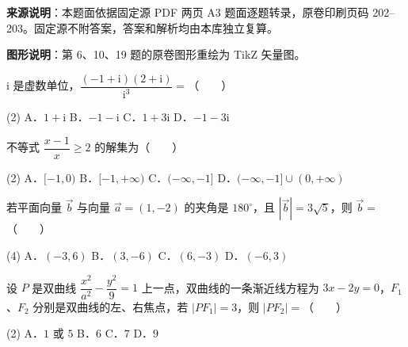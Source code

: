 

\begin{gktip}
\textbf{来源说明}：本题面依据固定源 PDF 两页 A3 题面逐题转录，原卷印刷页码 202–203。固定源不附答案，答案和解析均由本库独立复算。

\textbf{图形说明}：第 6、10、19 题的原卷图形重绘为 TikZ 矢量图。
\end{gktip}


\begin{question}
$\mathrm{i}$ 是虚数单位，$\dfrac{(-1 + \mathrm{i})(2 + \mathrm{i})}{\mathrm{i}^3} =$\mbox{（　　）}

\begin{gkopts}(2)
\task A．$1 + \mathrm{i}$
\task B．$-1 - \mathrm{i}$
\task C．$1 + 3\mathrm{i}$
\task D．$-1 - 3\mathrm{i}$
\end{gkopts}

\end{question}
\begin{question}
不等式 $\dfrac{x-1}{x} \ge 2$ 的解集为\mbox{（　　）}

\begin{gkopts}(2)
\task A．$[-1, 0)$
\task B．$[-1, +\infty)$
\task C．$(-\infty, -1]$
\task D．$(-\infty, -1] \cup (0, +\infty)$
\end{gkopts}

\end{question}
\begin{question}
若平面向量 $\vec{b}$ 与向量 $\vec{a} = (1, -2)$ 的夹角是 $180^\circ$，且 $|\vec{b}| = 3\sqrt{5}$，则 $\vec{b} =$\mbox{（　　）}

\begin{gkopts}(4)
\task A．$(-3, 6)$
\task B．$(3, -6)$
\task C．$(6, -3)$
\task D．$(-6, 3)$
\end{gkopts}

\end{question}
\begin{question}
设 $P$ 是双曲线 $\dfrac{x^2}{a^2} - \dfrac{y^2}{9} = 1$ 上一点，双曲线的一条渐近线方程为 $3x - 2y = 0$，$F_1$、$F_2$ 分别是双曲线的左、右焦点，若 $|PF_1| = 3$，则 $|PF_2| =$\mbox{（　　）}

\begin{gkopts}(2)
\task A．$1$ 或 $5$
\task B．$6$
\task C．$7$
\task D．$9$
\end{gkopts}

\end{question}
